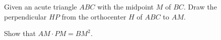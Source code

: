 Given an acute triangle $ABC$ with the midpoint $M$ of $BC$. Draw the perpendicular $HP$ from the orthocenter $H$ of $ABC$ to $AM$.

Show that $AM\cdot PM=BM^2$.